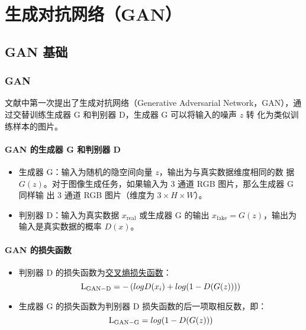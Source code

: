 \part{生成对抗网络（GAN）}

\chapter{GAN 基础}
\section{GAN}

文献中第一次提出了生成对抗网络（Generative Adversarial
Network，GAN），通过交替训练生成器 G 和判别器 D，生成器 G 可以将输入的噪声 $z$ 转
化为类似训练样本的图片。

\subsection{GAN 的生成器 G 和判别器 D}

\begin{itemize}
  \item 生成器 G：输入为随机的隐空间向量 $z$，输出为与真实数据维度相同的数
    据 $G(z)$。对于图像生成任务，如果输入为 3 通道 RGB 图片，那么生成器 G 同样输
    出 3 通道 RGB 图片（维度为 $3 \times H \times W$）。
  \item 判别器 D：输入为真实数据 $x_{\mathrm{real}}$ 或生成器 G 的输出
    $x_{\mathrm{fake}} = G(z)$，输出为输入是真实数据的概率 $D(x)$。
\end{itemize}

\subsection{GAN 的损失函数}

\begin{itemize}
  \item 判别器 D 的损失函数为\hyperref[subsec:CELoss]{交叉熵损失函数}：
  \begin{equation}
    \label{equ:GAN-D}
    \mathrm{L}_{\mathrm{GAN-D}} = - \left( \\log D(x_i) + \\log (1-D(G(z))) \right )
  \end{equation}

  \item 生成器 G 的损失函数为判别器 D 损失函数的后一项取相反数，即：
  \begin{equation}
    \label{equ:GAN-G}
    \mathrm{L}_{\mathrm{GAN-G}} =  \\log (1-D(G(z)))
  \end{equation}
\end{itemize}

